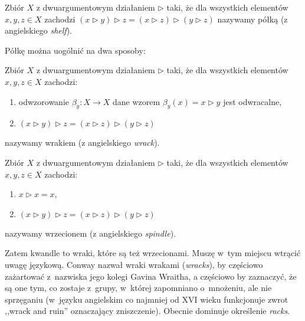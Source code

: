 \begin{definition}[półka]
    Zbiór $X$ z dwuargumentowym działaniem $\triangleright$ taki, że dla wszystkich elementów $x, y, z \in X$ zachodzi $(x \triangleright y) \triangleright z = (x \triangleright z) \triangleright (y \triangleright z)$ nazywamy półką (z angielskiego \emph{shelf}).
\end{definition}

Półkę można uogólnić na dwa sposoby:

\begin{definition}[wrak]
    Zbiór $X$ z dwuargumentowym działaniem $\triangleright$ taki, że dla wszystkich elementów $x, y, z \in X$ zachodzi:
    \begin{enumerate}
        \item odwzorowanie $\beta_y \colon X \to X$ dane wzorem $\beta_y(x) = x \triangleright y$ jest odwracalne,
        \item $(x \triangleright y) \triangleright z = (x \triangleright z) \triangleright (y \triangleright z)$
    \end{enumerate}
    nazywamy wrakiem (z angielskiego \emph{wrack}).
\end{definition}

\begin{definition}[wrzeciono]
    Zbiór $X$ z dwuargumentowym działaniem $\triangleright$ taki, że dla wszystkich elementów $x, y, z \in X$ zachodzi:
    \begin{enumerate}
        \item $x \triangleright x = x$,
        \item $(x \triangleright y) \triangleright z = (x \triangleright z) \triangleright (y \triangleright z)$
    \end{enumerate}
    nazywamy wrzecionem (z angielskiego \emph{spindle}).
\end{definition}

Zatem kwandle to wraki, które są też wrzecionami.
Muszę w~tym miejscu wtrącić uwagę językową.
Conway nazwał wraki wrakami (\emph{wracks}), by częściowo zażartować z~nazwiska jego kolegi Gavina Wraitha, a częściowo by zaznaczyć, że są one tym, co zostaje z~grupy, w~której zapomniano o~mnożeniu, ale nie sprzęganiu (w~języku angielskim co najmniej od XVI wieku funkcjonuje zwrot ,,wrack and ruin'' oznaczający zniszczenie).
Obecnie dominuje określenie \emph{racks}.


